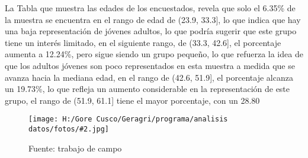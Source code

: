 \documentclass{article}\usepackage[]{graphicx}\usepackage[table]{xcolor}
\newenvironment{fotos}[2]
{\begin{figure}[H]
	\centering
	\caption{#1}
	\texttt{[image: H:/Gore Cusco/Geragri/programa/analisis datos/fotos/\#2.jpg]}
	\caption*{Fuente: trabajo de campo}}
{\end{figure}}
\begin{document}
La Tabla que muestra las edades de los encuestados, revela que solo el 6.35\% de la muestra se encuentra en el rango de edad de (23.9, 33.3], lo que indica que hay una baja representación de jóvenes adultos, lo que podría sugerir que este grupo tiene un interés limitado, en el siguiente rango, de (33.3, 42.6], el porcentaje aumenta a 12.24\%, pero sigue siendo un grupo pequeño, lo que refuerza la idea de que los adultos jóvenes son poco representados en esta muestra a medida que se avanza hacia la mediana edad, en el rango de (42.6, 51.9], el porcentaje alcanza un 19.73\%, lo que refleja un aumento considerable en la representación de este grupo, el rango de (51.9, 61.1] tiene el mayor porcentaje, con un 28.80%

\begin{fotos}
{Aplicacion de encuestas}{1}
\end{fotos}
\end{document}
